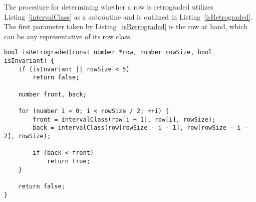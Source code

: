 The procedure for determining whether a row is retrograded utilizes Listing~\ref{intervalClass} as a subroutine and is outlined in Listing~\ref{isRetrograded}. The first parameter taken by Listing~\ref{isRetrograded} is the row at hand, which can be any representative of its row class.

\begin{lstlisting}[caption={Determining whether a representative of a row class is retrograded.},label={isRetrograded}]
bool isRetrograded(const number *row, number rowSize, bool isInvariant) {
    if (isInvariant || rowSize < 5)
        return false;

    number front, back;

    for (number i = 0; i < rowSize / 2; ++i) {
        front = intervalClass(row[i + 1], row[i], rowSize);
        back = intervalClass(row[rowSize - i - 1], row[rowSize - i - 2], rowSize);

        if (back < front)
            return true;
    }

    return false;
}
\end{lstlisting}


